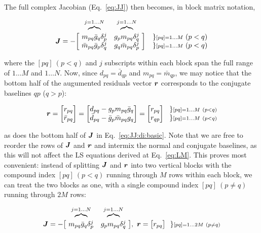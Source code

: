 \documentclass[useAMS,usenatbib]{mn2e}
\newcommand{\mat}[1]{{\bmath{#1}}}
\newcommand{\JJ}{\mat{J}} %
\begin{document}
The full complex Jacobian (Eq.~\ref{eq:JJ}) then becomes, in block matrix notation,

\begin{equation}
\label{eq:JJ:di:basic}
\begin{array}{r@{~}cc@{~}cc}
                & \overbrace{}^{j=1\dots N} & \overbrace{}^{j=1\dots N} \\
\JJ = - \bigg [ &
  \Stack{ m_{pq}\bar{g}_q\delta^{j}_p \\ \bar{m}_{pq} \bar{g}_p \delta^{j}_q } &
  \Stack{ g_p m_{pq} \delta^{j}_q \\ g_q \bar{m}_{pq} \delta^{j}_p }  
& \bigg ] &
\Stack{ \} {\scriptstyle [pq]=1\dots M}~(p<q) \\ \} {\scriptstyle [pq]=1\dots M}~(p<q) }

\end{array}
\end{equation}

where the $[pq]~(p<q)$ and $j$ subscripts within each block span the full range of $1\dots M$ and $1\dots N$. Now, 
since $d_{pq} = \bar{d}_{qp}$ and $m_{pq} = \bar{m}_{qp}$, we may notice
that the bottom half of the augumented residuals vector $\bmath{r}$ corresponds to the conjugate baselines 
$qp$ ($q>p$):


\[
\bmath{r} = \Matrix{c}{ r_{pq} \\ \bar{r}_{pq} } = \Matrix{c}{d_{pq}-g_p m_{pq}\bar{g}_q\\ \bar{d}_{pq}-\bar{g}_p \bar{m}_{pq}g_q} = 
\Matrix{c}{ r_{pq} \\ r_{qp} }~~ 
\Stack{ \} \scriptstyle [pq]=1\dots M~(p<q) \\ \} \scriptstyle [pq]=1\dots M~(p<q) }
\]

as does the bottom half of $\JJ$ in Eq.~\ref{eq:JJ:di:basic}. Note that we are free to reorder the rows of $\JJ$ and $\bmath{r}$ 
and intermix the normal and conjugate baselines, as this will not affect the LS equations derived at Eq.~\ref{eq:LM}.
This proves most convenient: instead of splitting $\JJ$ and $\bmath{r}$ into 
two vertical blocks with the compound index $[pq]~(p<q)$ running through $M$ rows within each block, we can treat 
the two blocks as one, with a single compound index $[pq]~(p\ne q)$ running through $2M$ rows:

\begin{equation}
\label{eq:JJ:di}
\begin{array}{r@{~}cc@{~}cc}
                & \overbrace{}^{j=1\dots N} & \overbrace{}^{j=1\dots N} \\
\JJ = - \big [ & m_{pq}\bar{g}_q\delta^{j}_p & g_p m_{pq} \delta^{j}_q & \big ],~
\bmath{r} = \big [ r_{pq} \big ] ~~{\} \scriptstyle [pq]=1\dots 2M~(p\ne q)}
\end{array}
\end{equation}
\end{document}
